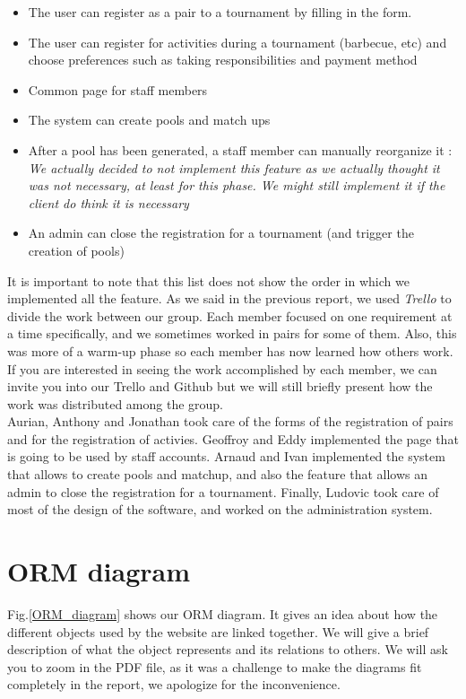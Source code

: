 \documentclass[a4paper, 12pt]{article}
\begin{document}
\begin{itemize}
\item The user can register as a pair to a tournament by filling in the form.
\item The user can register for activities during a tournament (barbecue, etc) and choose preferences such as taking responsibilities and payment method
\item Common page for staff members
\item The system can create pools and match ups
\item After a pool has been generated, a staff member can manually reorganize it : \textit{We actually decided to not implement this feature as we actually thought it was not necessary, at least for this phase. We might still implement it if the client do think it is necessary}
\item An admin can close the registration for a tournament (and trigger the creation of pools) \\

\end{itemize}

It is important to note that this list does not show the order in which we implemented all the feature. As we said in the previous report, we used \textit{Trello} to divide the work between our group. Each member focused on one requirement at a time  specifically, and we sometimes worked in pairs for some of them. Also, this was more of a warm-up phase so each member has now learned how others work. If you are interested in seeing the work accomplished by each member, we can invite you into our Trello and Github but we will still briefly present how the work was distributed among the group. \\

Aurian, Anthony and Jonathan took care of the forms of the registration of pairs and for the registration of activies. Geoffroy and Eddy implemented the page that is going to be used by staff accounts. Arnaud and Ivan implemented the system that allows to create pools and matchup, and also the feature that allows an admin to close the registration for a tournament. Finally, Ludovic took care of most of the design of the software, and worked on the administration system.
\section{ORM diagram}

 Fig.\ref{ORM_diagram} shows our ORM diagram. It gives an idea about how the different objects used by the website are linked together. We will give a brief description of what the object represents and its relations to others. We will ask you to zoom in the PDF file, as it was a challenge to make the diagrams fit completely in the report, we apologize for the inconvenience.\\
 
\end{document}
